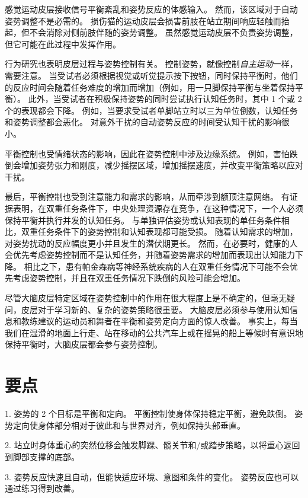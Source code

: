 感觉运动皮层接收信号平衡紊乱和姿势反应的体感输入。
然而，该区域对于自动姿势调整不是必需的。
损伤猫的运动皮层会损害前肢在站立期间响应轻触而抬起，但不会消除对侧前肢伴随的姿势调整。
虽然感觉运动皮层不负责姿势调整，但它可能在此过程中发挥作用。


行为研究也表明皮层过程与姿势控制有关。
控制姿势，就像控制\textit{自主运动}一样，需要注意。
当受试者必须根据视觉或听觉提示按下按钮，同时保持平衡时，他们的反应时间会随着任务难度的增加而增加（例如，用一只脚保持平衡与坐着保持平衡）。
此外，当受试者在积极保持姿势的同时尝试执行认知任务时，其中 1 个或 2 个的表现都会下降。
例如，当要求受试者单脚站立时以三为单位倒数，认知任务和姿势调整都会恶化。
对意外干扰的自动姿势反应的时间受认知干扰的影响很小。


平衡控制也受情绪状态的影响，因此在姿势控制中涉及边缘系统。
例如，害怕跌倒会增加姿势张力和刚度，减少摇摆区域，增加摇摆速度，并改变平衡策略以应对干扰。


最后，平衡控制也受到注意能力和需求的影响，从而牵涉到额顶注意网络。
有证据表明，在双重任务条件下，中央处理资源存在竞争，在这种情况下，一个人必须保持平衡并执行并发的认知任务。
与单独评估姿势或认知表现的单任务条件相比，双重任务条件下的姿势控制和认知表现都可能受损。
随着认知需求的增加，对姿势扰动的反应幅度更小并且发生的潜伏期更长。
然而，在必要时，健康的人会优先考虑姿势控制而不是认知任务，并随着姿势需求的增加而表现出认知能力下降。
相比之下，患有帕金森病等神经系统疾病的人在双重任务情况下可能不会优先考虑姿势控制，并且在双重任务情况下跌倒的风险可能会增加。


尽管大脑皮层特定区域在姿势控制中的作用在很大程度上是不确定的，但毫无疑问，皮层对于学习新的、复杂的姿势策略很重要。
大脑皮层必须参与使用认知信息和教练建议的运动员和舞者在平衡和姿势定向方面的惊人改善。
事实上，每当我们在湿滑的地面上行走、站在移动的公共汽车上或在摇晃的船上等候时有意识地保持平衡时，大脑皮层都会参与姿势控制。



\section{要点}

1. 姿势的 2 个目标是平衡和定向。
平衡控制使身体保持稳定平衡，避免跌倒。
姿势定向使身体部分相对于彼此和与世界对齐，例如保持头部垂直。


2. 站立时身体重心的突然位移会触发脚踝、髋关节和/或踏步策略，以将重心返回到脚部支撑的底部。


3. 姿势反应快速且自动，但能快适应环境、意图和条件的变化。
姿势反应也可以通过练习得到改善。



